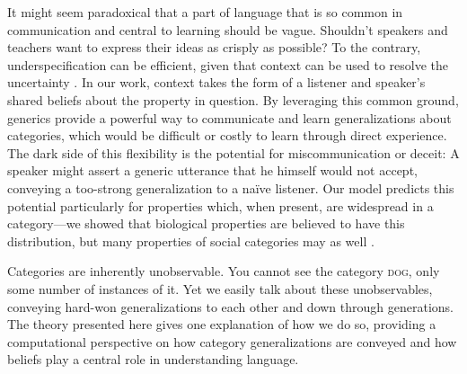 \documentclass[12pt,letterpaper]{article}
\begin{document}


It might seem paradoxical that a part of language that is so common in communication and central to learning should be vague. 
Shouldn't speakers and teachers want to express their ideas as crisply as possible?
To the contrary, underspecification can be efficient, given that context can be used to resolve the uncertainty \cite{Piantadosi2012}.
In our work, context takes the form of a listener and speaker's shared beliefs about the property in question. 
By leveraging this common ground, generics provide a powerful way to communicate and learn generalizations about categories, 
which would be difficult or costly to learn through direct experience.
The dark side of this flexibility is the potential for miscommunication or deceit: A speaker might assert a generic utterance that he himself would not accept, conveying a too-strong generalization to a na\"{i}ve listener.  
Our model predicts this potential particularly for properties which, when present, are widespread in a category---we showed that biological properties are believed to have this distribution, but many properties of social categories may as well \cite{Cimpian2011a,Cimpian2012b,Rhodes2012}.


Categories are inherently unobservable. 
You cannot see the category \textsc{dog}, only some number of instances of it.
Yet we easily talk about these unobservables, conveying hard-won generalizations to each other and down through generations.
The theory presented here gives one explanation of how we do so, providing a computational perspective on how category generalizations are conveyed and how beliefs play a central role in understanding language.
\end{document}
